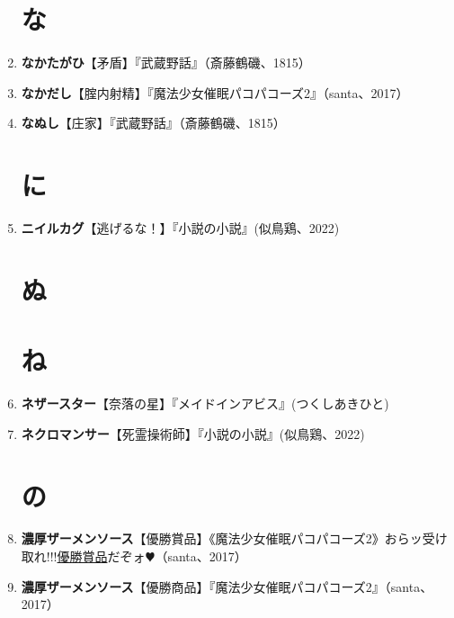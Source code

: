 \documentclass[twocolumn]{jsbook}
\newcommand{\ccite}[1]{《#1》}
\begin{document}
\begin{enumerate}
\section*{な}
    \item \textbf{なかたがひ}【矛盾】『武蔵野話』（斎藤鶴磯、1815）
    \item \textbf{なかだし}【腟内射精】『魔法少女催眠パコパコーズ2』（santa、2017）
    \item \textbf{なぬし}【庄家】『武蔵野話』（斎藤鶴磯、1815）
\section*{に}
    \item \textbf{ニイルカグ}【逃げるな！】『小説の小説』(似鳥鶏、2022)
\section*{ぬ}
\section*{ね}
    \item \textbf{ネザースター}【奈落の星】『メイドインアビス』(つくしあきひと)
    \item \textbf{ネクロマンサー}【死霊操術師】『小説の小説』(似鳥鶏、2022)
\section*{の}
    \item \textbf{濃厚ザーメンソース}【優勝賞品】\ccite{魔法少女催眠パコパコーズ2}{おらッ受け取れ!!!\uline{優勝賞品}だぞォ$\varheartsuit$}（santa、2017）
    \item \textbf{濃厚ザーメンソース}【優勝商品】『魔法少女催眠パコパコーズ2』（santa、2017）

\end{enumerate}
\end{document}
